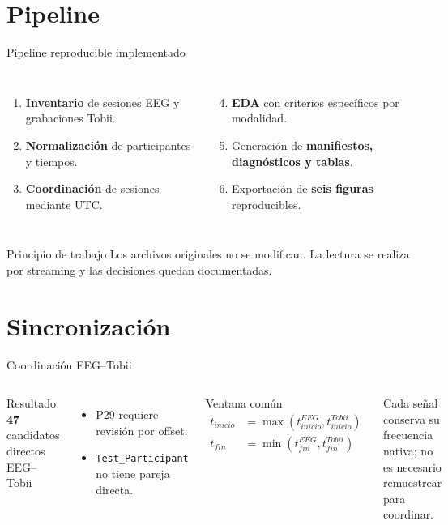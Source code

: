 \documentclass[aspectratio=169]{beamer}
\begin{document}
\section{Pipeline}
\begin{frame}{Pipeline reproducible implementado}
\begin{columns}[t]
\begin{enumerate}
  \item \textbf{Inventario} de sesiones EEG y grabaciones Tobii.
  \item \textbf{Normalización} de participantes y tiempos.
  \item \textbf{Coordinación} de sesiones mediante UTC.
\end{enumerate}
\begin{enumerate}
  \setcounter{enumi}{3}
  \item \textbf{EDA} con criterios específicos por modalidad.
  \item Generación de \textbf{manifiestos, diagnósticos y tablas}.
  \item Exportación de \textbf{seis figuras} reproducibles.
\end{enumerate}
\end{columns}

\begin{alertblock}{Principio de trabajo}
Los archivos originales no se modifican. La lectura se realiza por streaming y las decisiones
quedan documentadas.
\end{alertblock}
\end{frame}

\section{Sincronización}
\begin{frame}{Coordinación EEG--Tobii}
\begin{columns}[t]
\begin{block}{Resultado}
\centering
{\Huge \textbf{47}}\\
candidatos directos EEG--Tobii
\end{block}

\begin{itemize}
  \item P29 requiere revisión por offset.
  \item \texttt{Test\_Participant} no tiene pareja directa.
\end{itemize}

\begin{block}{Ventana común}
\begin{align*}
t_{inicio} &= \max(t_{inicio}^{EEG},t_{inicio}^{Tobii}) \\
t_{fin} &= \min(t_{fin}^{EEG},t_{fin}^{Tobii})
\end{align*}
\end{block}
Cada señal conserva su frecuencia nativa; no es necesario remuestrear para coordinar.
\end{columns}
\end{frame}
\end{document}
